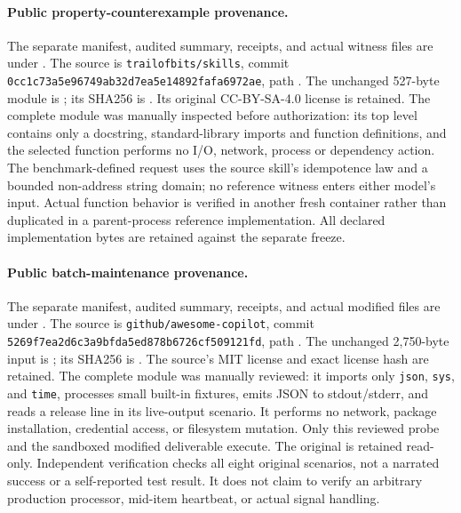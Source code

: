 \documentclass{article}
\theoremstyle{plain}
\theoremstyle{definition}
\newcommand{\id}[1]{\texttt{#1}}
\begin{document}
\paragraph{Public property-counterexample provenance.}
The separate manifest, audited summary, receipts, and actual witness files
are under .
The source is \id{trailofbits/skills}, commit
\id{0cc1c73a5e96749ab32d7ea5e14892fafa6972ae}, path
.
The unchanged 527-byte module is
;
its SHA256 is .
Its original CC-BY-SA-4.0 license is retained. The complete module was
manually inspected before authorization: its top level contains only a
docstring, standard-library imports and function definitions, and the
selected function performs no I/O, network, process or dependency action.
The benchmark-defined request uses the source skill's idempotence law and
a bounded non-address string domain; no reference witness enters either
model's input. Actual function behavior is verified in another fresh
container rather than duplicated in a parent-process reference implementation.
All declared implementation bytes are retained against the separate freeze.

\paragraph{Public batch-maintenance provenance.}
The separate manifest, audited summary, receipts, and actual modified files
are under .
The source is \id{github/awesome-copilot}, commit
\id{5269f7ea2d6c3a9bfda5ed878b6726cf509121fd}, path
. The unchanged 2,750-byte
input is ; its
SHA256 is .
The source's MIT license and exact license hash are retained. The complete
module was manually reviewed: it imports only \id{json}, \id{sys}, and
\id{time}, processes small built-in fixtures, emits JSON to stdout/stderr,
and reads a release line in its live-output scenario. It performs no
network, package installation, credential access, or filesystem mutation.
Only this reviewed probe and the sandboxed modified deliverable execute.
The original is retained read-only. Independent verification checks all
eight original scenarios, not a narrated success or a self-reported test
result. It does not claim to verify an arbitrary production processor,
mid-item heartbeat, or actual signal handling.
\end{document}

